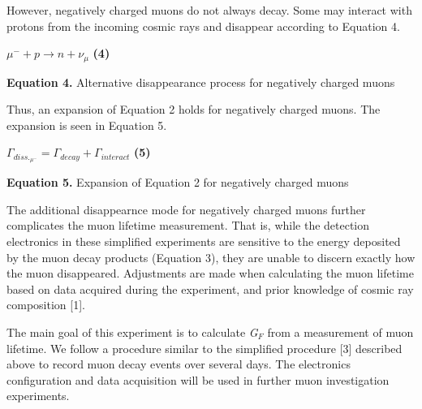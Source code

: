 \documentclass{article}
\begin{document}
However, negatively charged muons do not always decay. Some may interact with protons from the incoming cosmic rays and disappear according to Equation 4. 

\begin{center}
    
    $\mu^{-} + \textit{p} \rightarrow \textit{n} +  \nu_{\mu}$ \hspace{10mm} \textbf{(4)}
    
    \vspace{5mm}
    
    \textbf{Equation 4.} Alternative disappearance process for negatively charged muons 
    
\end{center}

Thus, an expansion of Equation 2 holds for negatively charged muons. The expansion is seen in Equation 5. 
\begin{center}
    
    $\Gamma_{diss._{\mu^{-}}} = \Gamma_{decay} + \Gamma_{interact}$ \hspace{10mm} \textbf{(5)}
    
    \vspace{5mm}
    
    \textbf{Equation 5.} Expansion of Equation 2 for negatively charged muons
    
\end{center}

The additional disappearnce mode for negatively charged muons further complicates the muon lifetime measurement. That is, while the detection electronics in these simplified experiments are sensitive to the energy deposited by the muon decay products (Equation 3), they are unable to discern exactly how the muon disappeared. Adjustments are made when calculating the muon lifetime based on data acquired during the experiment, and prior knowledge of cosmic ray composition [1]. %

The main goal of this experiment is to calculate \textit{G$_{F}$} from a measurement of muon lifetime. We follow a procedure similar to the simplified procedure [3] %
described above to record muon decay events over several days. The electronics configuration and data acquisition will be used in further muon investigation experiments. 
 

 
\end{document}
